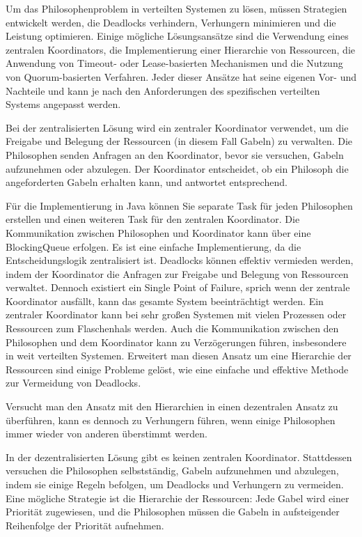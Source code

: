 \documentclass[../vs-script-first-v01.tex]{subfiles}
\begin{document}
Um das Philosophenproblem in verteilten Systemen zu lösen, müssen Strategien entwickelt werden, die Deadlocks verhindern, Verhungern minimieren und die Leistung optimieren. Einige mögliche Lösungsansätze sind die Verwendung eines zentralen Koordinators, die Implementierung einer Hierarchie von Ressourcen, die Anwendung von Timeout- oder Lease-basierten Mechanismen und die Nutzung von Quorum-basierten Verfahren. Jeder dieser Ansätze hat seine eigenen Vor- und Nachteile und kann je nach den Anforderungen des spezifischen verteilten Systems angepasst werden.

Bei der zentralisierten Lösung wird ein zentraler Koordinator verwendet, um die Freigabe und Belegung der Ressourcen (in diesem Fall Gabeln) zu verwalten. Die Philosophen senden Anfragen an den Koordinator, bevor sie versuchen, Gabeln aufzunehmen oder abzulegen. Der Koordinator entscheidet, ob ein Philosoph die angeforderten Gabeln erhalten kann, und antwortet entsprechend.

Für die Implementierung in Java können Sie separate Task für jeden Philosophen erstellen und einen weiteren Task für den zentralen Koordinator. Die Kommunikation zwischen Philosophen und Koordinator kann über eine BlockingQueue erfolgen.
Es ist eine einfache Implementierung, da die Entscheidungslogik zentralisiert ist. Deadlocks können effektiv vermieden werden, indem der Koordinator die Anfragen zur Freigabe und Belegung von Ressourcen verwaltet.
Dennoch existiert ein Single Point of Failure, sprich wenn der zentrale Koordinator ausfällt, kann das gesamte System beeinträchtigt werden.
Ein zentraler Koordinator kann bei sehr großen Systemen mit vielen Prozessen oder Ressourcen zum Flaschenhals werden. Auch die Kommunikation zwischen den Philosophen und dem Koordinator kann zu Verzögerungen führen, insbesondere in weit verteilten Systemen.
Erweitert man diesen Ansatz um eine Hierarchie der Ressourcen sind einige Probleme gelöst, wie eine einfache und effektive Methode zur Vermeidung von Deadlocks.

Versucht man den Ansatz mit den Hierarchien in einen dezentralen Ansatz zu überführen, kann es dennoch zu Verhungern führen, wenn einige Philosophen immer wieder von anderen überstimmt werden.

In der dezentralisierten Lösung gibt es keinen zentralen Koordinator. Stattdessen versuchen die Philosophen selbstständig, Gabeln aufzunehmen und abzulegen, indem sie einige Regeln befolgen, um Deadlocks und Verhungern zu vermeiden. Eine mögliche Strategie ist die Hierarchie der Ressourcen: Jede Gabel wird einer Priorität zugewiesen, und die Philosophen müssen die Gabeln in aufsteigender Reihenfolge der Priorität aufnehmen.
\end{document}
